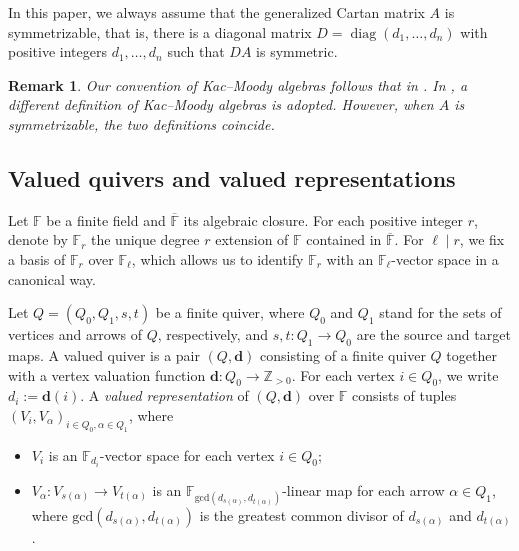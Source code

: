 \documentclass[12pt,reqno]{amsart}
\numberwithin{equation}{section}
\newcommand{\diag}{{\operatorname{diag}\nolimits}}
\newtheorem{remark}[theorem]{Remark}
\def \gcd{\mathrm{gcd}}
\begin{document}
	In this paper, we always assume that the generalized Cartan matrix $A$ is symmetrizable, that is, there is a diagonal matrix $D=\diag(d_1,\dots, d_n)$ with positive integers $d_1,\dots,d_n$ such that $DA$ is symmetric. 
	
	\begin{remark}
		Our convention of Kac--Moody algebras follows that  in \cite{B89-GIM-alg}. In \cite{Kac90}, a different definition of Kac–Moody algebras is adopted. However, when $A$ is symmetrizable, %
		the two definitions coincide.
	\end{remark}
	
	
	\subsection{Valued quivers and valued representations}\label{ss:valued-quiver}
	Let $\mathbb{F}$ be a finite field and $\overline{\mathbb{F}}$ its algebraic closure. For each positive integer $r$, denote by $\mathbb{F}_r$ the unique degree $r$ extension of $\mathbb{F}$ contained in $\overline{\mathbb{F}}$. For $\ell\mid r$, we fix a basis of $\mathbb{F}_r$ over $\mathbb{F}_\ell$, which allows us to identify $\mathbb{F}_r$ with an $\mathbb{F}_\ell$-vector space in a canonical way.
	
	Let $Q=(Q_0,Q_1,s,t)$ be a finite quiver, where $Q_0$ and $Q_1$ stand for the sets of vertices and arrows of $Q$, respectively, and $s,t\colon Q_1\rightarrow Q_0$ are the source and target maps.
	A valued quiver is a pair $(Q,\mathbf{d})$ consisting of a finite quiver $Q$ together with a vertex valuation function $\mathbf{d}\colon Q_0\rightarrow\mathbb{Z}_{>0}$. For each vertex $i\in Q_0$, we write $d_i:=\mathbf{d}(i)$.
	A {\it valued representation} of $(Q,\mathbf{d})$ over $\mathbb{F}$ consists of tuples $(V_i,V_\alpha)_{i\in Q_0,\alpha\in Q_1}$, where 
	\begin{itemize}
		\item $V_i$ is an $\mathbb{F}_{d_i}$-vector space for each vertex $i\in Q_0$;
		\item $V_\alpha:V_{s(\alpha)}\rightarrow V_{t(\alpha)}$ is an $\mathbb{F}_{\gcd(d_{s(\alpha)},d_{t(\alpha)})}$-linear map for each arrow $\alpha\in Q_1$, where $\gcd(d_{s(\alpha)},d_{t(\alpha)})$ is the greatest common divisor of $d_{s(\alpha)}$ and $d_{t(\alpha)}$.
	\end{itemize}
	
\end{document}
